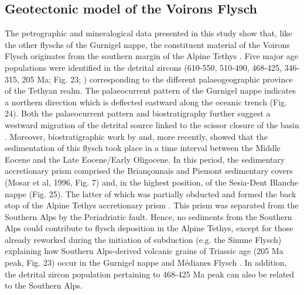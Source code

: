 \documentclass[twoside]{article}
\begin{document}
\subsection{Geotectonic model of the Voirons Flysch}

The petrographic and mineralogical data presented in this study show that, like the other flyschs of the Gurnigel nappe, the constituent material of the Voirons Flysch originates from the southern margin of the Alpine Tethys \citep{Butler2011}. Five major age populations were identified in the detrital zircons (610-550, 510-490, 468-425, 346-315, 205 Ma; Fig. 23; \citealp{Butler2011}) corresponding to the different palaeogeographic province of the Tethyan realm. The palaeocurrent pattern of the Gurnigel nappe indicates a northern direction which is deflected eastward along the oceanic trench \citep{Caron1980,Winkler1984,Wildi1985} (Fig. 24). Both the palaeocurrent pattern and biostratigraphy further suggest a westward migration of the detrital source linked to the scissor closure of the basin \citep{Winkler1984}. Moreover, biostratigraphic work by \citep{Ujetz1996} and, more recently, \citep{Ospina-Ostios2013} showed that the sedimentation of this flysch took place in a time interval between the Middle Eocene and the Late Eocene/Early Oligocene. In this period, the sedimentary accretionary prism comprised the Briançonnais and Piemont sedimentary covers (Mosar et al, 1996, Fig. 7) and, in the highest position, of the Sesia-Dent Blanche nappe \citep{Schmid1996,Handy2010} (Fig. 25). The latter of which was partially obducted and formed the back stop of the Alpine Tethys accretionary prism \citep{Stampfli1998,Manzotti2014}. This prism was separated from the Southern Alps by the Periadriatic fault. Hence, no sediments from the Southern Alps could contribute to flysch deposition in the Alpine Tethys, except for those already reworked during the initiation of subduction (e.g. the Simme Flysch) explaining how Southern Alps-derived volcanic grains of Triassic age (205 Ma peak, Fig. 23) occur in the Gurnigel nappe \citep{Butler2011} and Médianes Flysch \citep{Beltran-Trivino2013}. In addition, the detrital zircon population pertaining to 468-425 Ma peak can also be related to the Southern Alps.\par
\medskip
\end{document}
